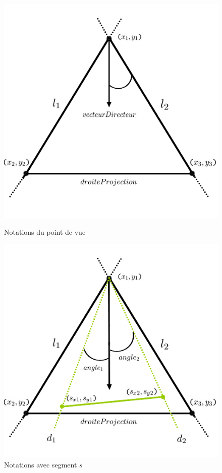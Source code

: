 \documentclass[11pt,a4paper]{article}
\theoremstyle{definition}
\theoremstyle{remark}
\begin{document}
\begin{figure}[!htbp]
  \centering
  \begin{minipage}[b]{0.4\textwidth}
    \includegraphics[width=\textwidth]{painter_notations.png}
    \caption{Notations du point de vue}
		\label{painter_notations}
  \end{minipage}
  \hfill
  \begin{minipage}[b]{0.4\textwidth}
    \includegraphics[width=\textwidth]{painter_notations_2.png}
    \caption{Notations avec segment $s$}
		\label{painter_notations_2}
  \end{minipage}
\end{figure}
\\
\end{document}
